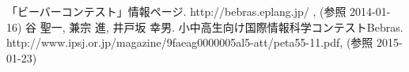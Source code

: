 \documentclass[a4paper]{jarticle}
\begin{document}
\begin{thebibliography}{1}

 「ビーバーコンテスト」情報ページ.  http://bebras.eplang.jp/ , (参照 2014-01-16)
 谷 聖一, 兼宗 進, 井戸坂 幸男. 小中高生向け国際情報科学コンテストBebras.  http://www.ipsj.or.jp/magazine/9faeag0000005al5-att/peta55-11.pdf, (参照 2015-01-23)



\end{thebibliography}
\end{document}
